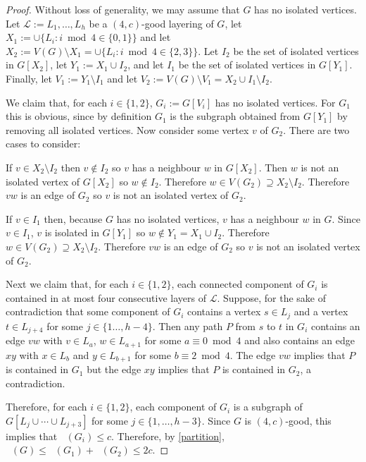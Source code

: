 \documentclass{patmorin}
\DeclareMathOperator{\odd}{\chi_o}
\begin{document}
\begin{proof}
  Without loss of generality, we may assume that $G$ has no isolated vertices.
  Let $\mathcal{L}:=L_1,\ldots,L_h$ be a $(4,c)$-good layering of $G$,
  let $X_1:=\cup\{L_i:i\bmod 4\in\{0,1\}\}$ and let $X_2:=V(G)\setminus X_1=\cup\{L_i:i\bmod 4\in\{2,3\}\}$.  Let $I_2$ be the set of isolated vertices in $G[X_2]$, let $Y_1:=X_1\cup I_2$, and let $I_1$ be the set of isolated vertices in $G[Y_1]$.  Finally, let $V_1:=Y_1\setminus I_1$ and let $V_2:=V(G)\setminus V_1=X_2\cup I_1\setminus I_2$.

  We claim that, for each $i\in\{1,2\}$, $G_i:=G[V_i]$ has no isolated vertices. For $G_1$ this is obvious, since by definition $G_1$ is the subgraph obtained from $G[Y_1]$ by removing all isolated vertices.  Now consider some vertex $v$ of $G_2$. There are two cases to consider:
  \begin{compactenum}
    \item If $v\in X_2\setminus I_2$ then $v\not\in I_2$ so $v$ has a neighbour $w$ in $G[X_2]$.  Then $w$ is not an isolated vertex of $G[X_2]$ so $w\not\in I_2$.  Therefore $w\in V(G_2)\supseteq X_2\setminus I_2$. Therefore $vw$ is an edge of $G_2$ so $v$ is not an isolated vertex of $G_2$.
    \item If $v\in I_1$ then, because $G$ has no isolated vertices, $v$ has a neighbour $w$ in $G$.  Since $v\in I_1$, $v$ is isolated in $G[Y_1]$ so $w\not\in Y_1= X_1\cup I_2$. Therefore $w\in V(G_2)\supseteq X_2\setminus I_2$.  Therefore $vw$ is an edge of $G_2$ so $v$ is not an isolated vertex of $G_2$.
  \end{compactenum}
  Next we claim that, for each $i\in\{1,2\}$, each connected component of $G_i$ is contained in at most four consecutive layers of $\mathcal{L}$.  Suppose, for the sake of contradiction that some component of $G_i$ contains a vertex $s\in L_j$ and a vertex $t\in L_{j+4}$ for some $j\in\{1\ldots,h-4\}$.  Then any path $P$ from $s$ to $t$ in $G_i$ contains an edge $vw$ with $v\in L_a$, $w\in L_{a+1}$ for some $a\equiv 0\bmod 4$ and also contains an edge $xy$ with $x\in L_b$ and $y\in L_{b+1}$ for some $b\equiv 2\bmod 4$.  The edge $vw$ implies that $P$ is contained in $G_1$ but the edge $xy$ implies that $P$ is contained in $G_2$, a contradiction.

  Therefore, for each $i\in\{1,2\}$, each component of $G_i$ is a subgraph of $G[L_j\cup\cdots\cup L_{j+3}]$ for some $j\in\{1,\ldots,h-3\}$.  Since $G$ is $(4,c)$-good, this implies that $\odd(G_i)\le c$.  Therefore, by \cref{partition}, $\odd(G)\le \odd(G_1)+\odd(G_2)\le 2c$.
\end{proof}
\end{document}
